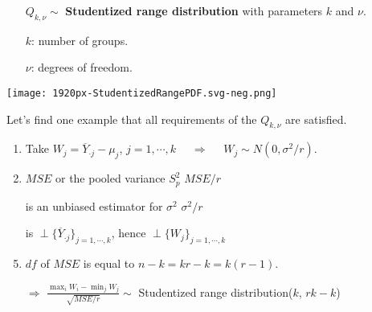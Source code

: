 \begin{frame}[fragile]
	\begin{center}

		\begin{enumerate}
			\item[] $Q_{k,\nu}\sim$ {\bf Studentized range distribution} with parameters $k$ and $\nu$.
			\item[] $k$: number of groups.
			\item[] $\nu$: degrees of freedom.
				\vfill
			\item[]
		\end{enumerate}
		\texttt{[image: 1920px-StudentizedRangePDF.svg-neg.png]}
	\end{center}
\end{frame}
\begin{frame}[fragile]
	Let's find one example that all requirements of the $Q_{k,\nu}$ are satisfied.
	\vfill
	\begin{enumerate}
		\item Take $W_j = \overline{Y}_{\cdot j}-\mu_j$, $j=1,\cdots,k$ $\quad\Longrightarrow\quad$ $W_j\sim N(0,\sigma^2/r)$.
			\vfill
		\item $MSE$ or the pooled variance $S_p^2$ \hfill $MSE/r$
		\item[] \qquad is an unbiased estimator for $\sigma^2$ \hfill $\sigma^2/r$
		\item[] \qquad is $\perp\{\overline{Y}_{\cdot j}\}_{j=1,\cdots, k}$, hence $\perp\{W_j\}_{j=1,\cdots, k}$
			\vfill
		\item $df$ of $MSE$ is equal to $n-k=kr-k = k(r-1)$.
			\vfill
		\item[$\Longrightarrow$] \hspace{1em} $\displaystyle \frac{\max_{i}W_i - \min_j W_j}{\sqrt{MSE/r}} \sim $ Studentized range distribution($k$, $rk-k$)
	\end{enumerate}
\end{frame}
